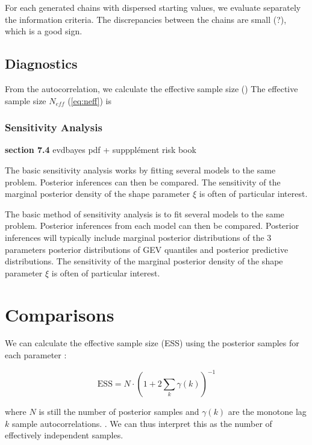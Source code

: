 For each generated chains with dispersed starting values, we evaluate separately the information criteria. The discrepancies between the chains are small (?), which is a good sign. 


\subsection{Diagnostics}


From the autocorrelation, we calculate the effective sample size () The effective sample size $N_{eff}$ (\ref{eq:neff}) is 

\subsubsection*{Sensitivity Analysis}

\textbf{section 7.4} evdbayes pdf + suppplément risk book 

The basic sensitivity analysis works by fitting several models to
the same problem. Posterior inferences can then be compared.
The sensitivity of the
marginal posterior density of the shape parameter $\xi$ is often of particular interest.


The basic method of sensitivity analysis is to fit several models to the same problem.
 Posterior inferences from each model can then be compared. Posterior inferences
will typically include marginal posterior distributions of the 3 parameters posterior distributions of GEV quantiles and posterior predictive distributions.
The sensitivity of the marginal posterior density of the shape parameter $\xi$ is often of particular interest.



\section{Comparisons}

\citet{hartmann_bayesian_2016}
We can calculate the effective sample size (ESS) using the posterior samples for each parameter : 

\begin{equation}
\text{ESS}=N\cdot (1+2\sum_k\gamma(k))^{-1}
\end{equation}

where $N$ is still the number of posterior samples and $\gamma(k)$ are the monotone lag $k$ sample autocorrelations. \citet{geyer__1992}. We can thus interpret this as the number of effectively independent samples. 


